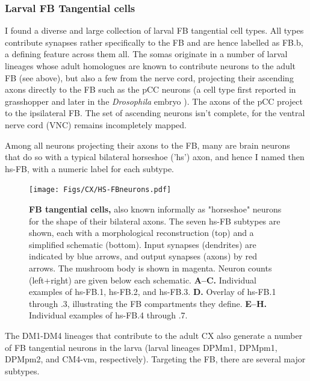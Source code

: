         \subsubsection{Larval FB Tangential cells}
        I found a diverse and large collection of larval FB tangential cell types.
        All types contribute synapses rather specifically to the FB and are hence labelled as FB.b, a defining feature across them all.
        The somas originate in a number of larval lineages whose adult homologues  are known to contribute neurons to the adult FB (see above), but also a few from the nerve cord, projecting their ascending axons directly to the FB such as the pCC neurons (a cell type first reported in grasshopper \citep{goodman1984pCC} and later in the \textit{Drosophila} embryo \citep{jacobs1989pCC}). The axons of the pCC project to the ipsilateral FB. The set of ascending neurons isn't complete, for the ventral nerve cord (VNC) remains incompletely mapped.

        Among all neurons projecting their axons to the FB, many are brain neurons that do so with a typical bilateral horseshoe ('hs') axon, and hence I named then hs-FB, with a numeric label for each subtype.

            \begin{figure}[H]
                \centering
                \texttt{[image: Figs/CX/HS-FBneurons.pdf]}
                \caption{\textbf{FB tangential cells,} also known informally as "horseshoe" neurons for the shape of their bilateral axons. The seven hs-FB subtypes are shown, each with a morphological reconstruction (top) and a simplified schematic (bottom). Input synapses (dendrites) are indicated by blue arrows, and output synapses (axons) by red arrows. The mushroom body is shown in magenta. Neuron counts (left+right) are given below each schematic. \textbf{A–C.} Individual examples of hs-FB.1, hs-FB.2, and hs-FB.3. \textbf{D.} Overlay of hs-FB.1 through .3, illustrating the FB compartments they define. \textbf{E–H.} Individual examples of hs-FB.4 through .7.}
            \label{fig:HSFBneurons}
            \end{figure}

        The DM1-DM4 lineages that contribute to the adult CX also generate a number of FB tangential neurons in the larva (larval lineages DPMm1, DPMpm1, DPMpm2, and CM4-vm, respectively). Targeting the FB, there are several major subtypes. 
        
